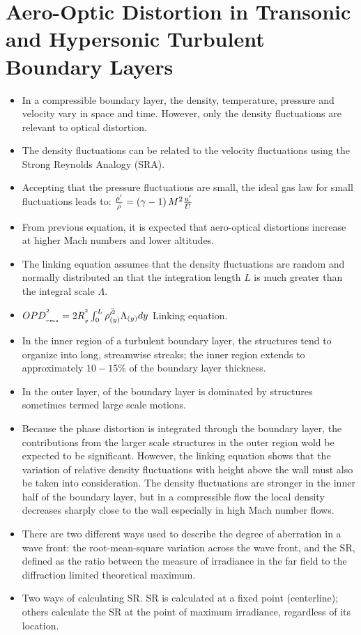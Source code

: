     \section{Aero-Optic Distortion in Transonic and Hypersonic Turbulent Boundary Layers \cite{doi:10.2514/1.41453}}
        \begin{itemize}
            \item In a compressible boundary layer, the density, temperature, pressure and velocity vary in space and time. However, only the density fluctuations are relevant to optical distortion. 
            \item The density fluctuations can be related to the velocity fluctuations using the Strong Reynolds Analogy (SRA). 
            \item Accepting that the pressure fluctuations are small, the ideal gas law for small fluctuations leads to: $\frac{\rho^{\prime}}{\bar{\rho}} = \left(\gamma -1\right) M^2\frac{u^{\prime}}{\bar{U}} $
            \item From previous equation, it is expected that aero-optical distortions increase at higher Mach numbers and lower altitudes. 
            \item The linking equation assumes that the density fluctuations are random and normally distributed an that the integration length $L$ is much greater than the integral scale $\Lambda$.
            \item $OPD_{_{rms}}^{^{2}} = 2 R_{_{g}}^{^{2}} \int^{L}_{0} \bar{\rho^{{\prime}^2}_{\left(y\right)}} \Lambda_{\left(y\right)}dy  $ Linking equation. 
            \item In the inner region of a turbulent boundary layer, the structures tend to organize into long, streamwise streaks; the inner region extends to approximately $10-15\%$ of the boundary layer thickness.
            \item In the outer layer, of the boundary layer is dominated by structures sometimes termed large scale motions. 
            \item Because the phase distortion is integrated through the boundary layer, the contributions from the larger scale structures in the outer region wold be expected to be significant. However, the linking equation shows that the variation of relative density fluctuations with height above the wall must also be taken into consideration. The density fluctuations are stronger in the inner half of the boundary layer, but in a compressible flow the local density decreases sharply close to the wall especially in high Mach number flows. 
            \item There are two different ways used to describe the degree of aberration in a wave front: the root-mean-square variation across the wave front, and the SR, defined as the ratio between the measure of irradiance in the far field to the diffraction limited theoretical maximum. 
            \item Two ways of calculating SR. SR is calculated at a fixed point (centerline); others calculate the SR at the point of maximum irradiance, regardless of its location. 
        \end{itemize}


